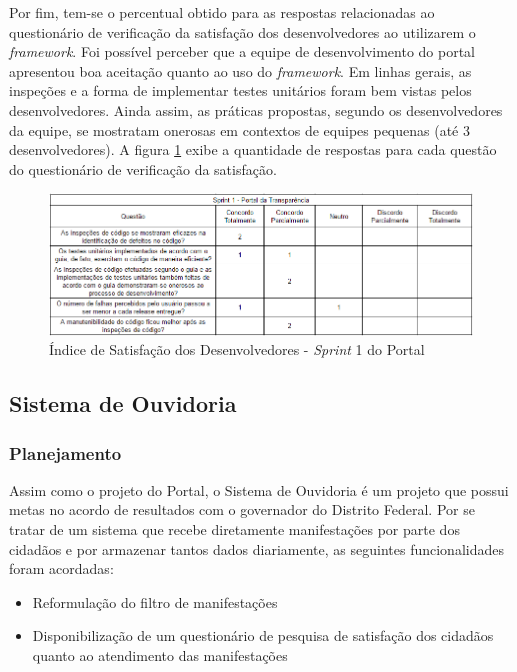 Por fim, tem-se o percentual obtido para as respostas relacionadas ao questionário de verificação da satisfação dos desenvolvedores ao utilizarem o \textit{framework}. Foi possível perceber que a equipe de desenvolvimento do portal apresentou boa aceitação quanto ao uso do \textit{framework}. Em linhas gerais, as inspeções e a forma de implementar testes unitários foram bem vistas pelos desenvolvedores. Ainda assim, as práticas propostas, segundo os desenvolvedores da equipe, se mostratam onerosas em contextos de equipes pequenas (até 3 desenvolvedores). A figura \ref{fig:satisfacaoPortal1} exibe a quantidade de respostas para cada questão do questionário de verificação da satisfação.

\begin{figure}[h]
\includegraphics[width=\textwidth]{figuras/isd_portal_1.png}
\caption{Índice de Satisfação dos Desenvolvedores - \textit{Sprint} 1 do Portal}
\label{fig:satisfacaoPortal1}
\end{figure}

\clearpage

\subsection{Sistema de Ouvidoria}

\subsubsection{Planejamento}

Assim como o projeto do Portal, o Sistema de Ouvidoria é um projeto que possui metas no acordo de resultados com o governador do Distrito Federal. Por se tratar de um sistema que recebe diretamente manifestações por parte dos cidadãos e por armazenar tantos dados diariamente, as seguintes funcionalidades foram acordadas:

\begin{itemize}
	\item Reformulação do filtro de manifestações
	\item Disponibilização de um questionário de pesquisa de satisfação dos cidadãos quanto ao atendimento das manifestações
\end{itemize}

